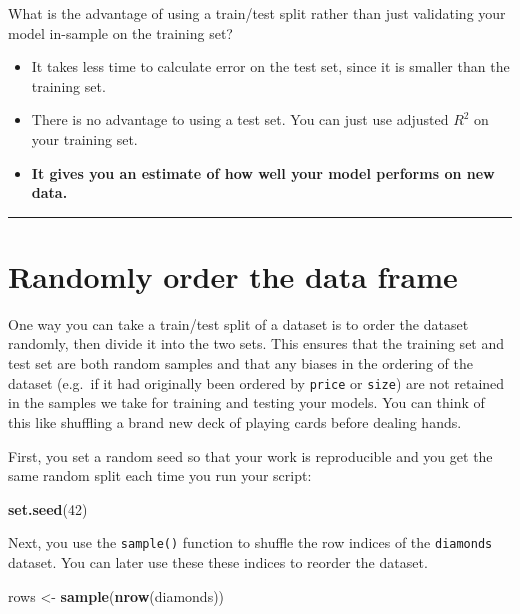 \documentclass[]{book}
\newenvironment{Shaded}{\begin{snugshade}}{\end{snugshade}}
\newcommand{\KeywordTok}[1]{\textcolor[rgb]{0.13,0.29,0.53}{\textbf{#1}}}
\newcommand{\DecValTok}[1]{\textcolor[rgb]{0.00,0.00,0.81}{#1}}
\newcommand{\StringTok}[1]{\textcolor[rgb]{0.31,0.60,0.02}{#1}}
\newcommand{\NormalTok}[1]{#1}
\begin{document}
What is the advantage of using a train/test split rather than just
validating your model in-sample on the training set?

\begin{itemize}
\item
  It takes less time to calculate error on the test set, since it is
  smaller than the training set.
\item
  There is no advantage to using a test set. You can just use adjusted
  \(R^2\) on your training set.
\item
  \textbf{It gives you an estimate of how well your model performs on
  new data.}
\end{itemize}

\begin{center}\rule{0.5\linewidth}{\linethickness}\end{center}

\section{Randomly order the data
frame}\label{randomly-order-the-data-frame}

One way you can take a train/test split of a dataset is to order the
dataset randomly, then divide it into the two sets. This ensures that
the training set and test set are both random samples and that any
biases in the ordering of the dataset (e.g.~if it had originally been
ordered by \texttt{price} or \texttt{size}) are not retained in the
samples we take for training and testing your models. You can think of
this like shuffling a brand new deck of playing cards before dealing
hands.

First, you set a random seed so that your work is reproducible and you
get the same random split each time you run your script:

\begin{Shaded}
\begin{Highlighting}[]
\KeywordTok{set.seed}\NormalTok{(}\DecValTok{42}\NormalTok{)}
\end{Highlighting}
\end{Shaded}

Next, you use the \texttt{sample()} function to shuffle the row indices
of the \texttt{diamonds} dataset. You can later use these these indices
to reorder the dataset.

\begin{Shaded}
\begin{Highlighting}[]
\NormalTok{rows <-}\StringTok{ }\KeywordTok{sample}\NormalTok{(}\KeywordTok{nrow}\NormalTok{(diamonds))}
\end{Highlighting}
\end{Shaded}
\end{document}
